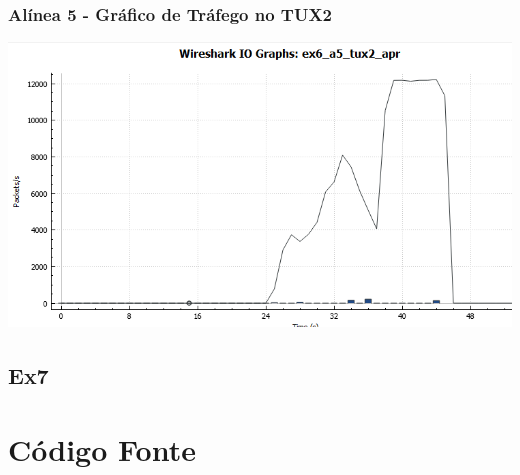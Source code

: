 \documentclass[11pt,a4paper,reqno]{report}
\numberwithin{equation}{section}
\begin{document}
\begin{appendices}
\subsection{Alínea 5 - Gráfico de Tráfego no TUX2}
\label{ex6_a5_2io}
\includegraphics[width=18cm]{ex6_a5_tux2_IO.png}

\section{Ex7}

\chapter{Código Fonte}






\pagebreak


\end{appendices}
\end{document}
